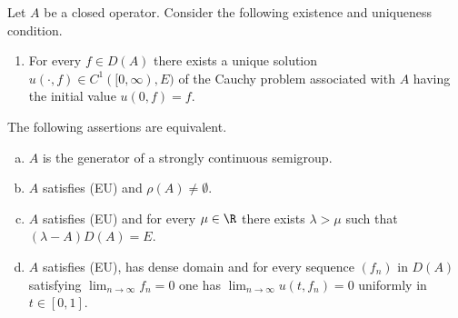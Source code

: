 \begin{corollary}\label{cor:a2-1.2}
Let $A$ be a closed operator.
Consider the following existence and uniqueness condition.
\begin{enumerate}[label=(EU)]

\item
For every $f \in D(A)$ there exists a unique solution \\
$u(\cdot,f) \in C^{1}([0,\infty),E)$ of the Cauchy problem associated with $A$ having the initial value $u(0,f) = f$.
\end{enumerate}
The following assertions are equivalent.
\begin{enumerate}[(a)]

\item\label{cor:a2-1.2-1}
$A$ is the generator of a strongly continuous semigroup.

\item\label{cor:a2-1.2-2}
$A$ satisfies (EU) and $\rho(A) \neq \emptyset$.

\item\label{cor:a2-1.2-3}
$A$ satisfies (EU) and for every $\mu \in \R$ there exists $\lambda > \mu$ such that $(\lambda-A)D(A) = E$.
\item\label{cor:a2-1.2-4}
$A$ satisfies (EU), has dense domain and for every sequence $(f_{n})$ in $D(A)$ satisfying $\lim_{n \to \infty}f_{n} = 0$ one has $\lim_{n \to \infty}u(t,f_{n}) = 0$ uniformly in $t \in [0,1]$.

\end{enumerate}
\end{corollary}
